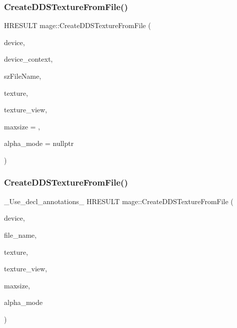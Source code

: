 \subsubsection{\texorpdfstring{Create\+D\+D\+S\+Texture\+From\+File()}{CreateDDSTextureFromFile()}\hspace{0.1cm}{\footnotesize\ttfamily [2/4]}}
{\footnotesize\ttfamily H\+R\+E\+S\+U\+LT mage\+::\+Create\+D\+D\+S\+Texture\+From\+File (\begin{DoxyParamCaption}\item[{\+\_\+\+In\+\_\+ I\+D3\+D11\+Device2 $\ast$}]{device,  }\item[{\+\_\+\+In\+\_\+opt\+\_\+ I\+D3\+D11\+Device\+Context $\ast$}]{device\+\_\+context,  }\item[{\+\_\+\+In\+\_\+z\+\_\+ const wchar\+\_\+t $\ast$}]{sz\+File\+Name,  }\item[{\+\_\+\+Outptr\+\_\+opt\+\_\+ I\+D3\+D11\+Resource $\ast$$\ast$}]{texture,  }\item[{\+\_\+\+Outptr\+\_\+opt\+\_\+ I\+D3\+D11\+Shader\+Resource\+View $\ast$$\ast$}]{texture\+\_\+view,  }\item[{\+\_\+\+In\+\_\+ size\+\_\+t}]{maxsize = {},  }\item[{\+\_\+\+Out\+\_\+opt\+\_\+ \hyperlink{namespacemage_a0c586a2bad862f4858900ca121ca80c2}{D\+D\+S\+\_\+\+A\+L\+P\+H\+A\+\_\+\+M\+O\+DE} $\ast$}]{alpha\+\_\+mode = {\ttfamily nullptr} }\end{DoxyParamCaption})}

\hypertarget{namespacemage_a3a3965b1c7679947007304baf7ba0cde}{}\label{namespacemage_a3a3965b1c7679947007304baf7ba0cde} 
\subsubsection{\texorpdfstring{Create\+D\+D\+S\+Texture\+From\+File()}{CreateDDSTextureFromFile()}\hspace{0.1cm}{\footnotesize\ttfamily [3/4]}}
{\footnotesize\ttfamily \+\_\+\+Use\+\_\+decl\+\_\+annotations\+\_\+ H\+R\+E\+S\+U\+LT mage\+::\+Create\+D\+D\+S\+Texture\+From\+File (\begin{DoxyParamCaption}\item[{I\+D3\+D11\+Device2 $\ast$}]{device,  }\item[{const wchar\+\_\+t $\ast$}]{file\+\_\+name,  }\item[{I\+D3\+D11\+Resource $\ast$$\ast$}]{texture,  }\item[{I\+D3\+D11\+Shader\+Resource\+View $\ast$$\ast$}]{texture\+\_\+view,  }\item[{size\+\_\+t}]{maxsize,  }\item[{\hyperlink{namespacemage_a0c586a2bad862f4858900ca121ca80c2}{D\+D\+S\+\_\+\+A\+L\+P\+H\+A\+\_\+\+M\+O\+DE} $\ast$}]{alpha\+\_\+mode }\end{DoxyParamCaption})}

